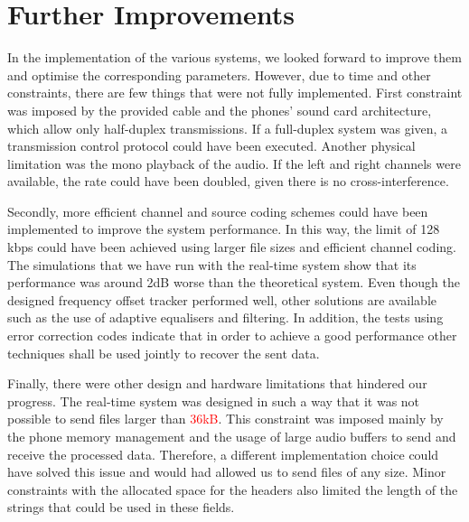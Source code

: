 \documentclass[12pt,a4paper,openright]{report}
\begin{document}
\section{Further Improvements}
In the implementation of the various systems, we looked forward to improve them and optimise the corresponding parameters. However, due to time and other constraints, there are few things that were not fully implemented. 
First constraint was imposed by the provided cable and the phones' sound card architecture, which allow only half-duplex transmissions. If a full-duplex system was given, a transmission control protocol could have been executed. Another physical limitation was the mono playback of the audio. If the left and right channels were available, the rate could have been doubled, given there is no cross-interference. 

Secondly, more efficient channel and source coding schemes could have been implemented to improve the system performance. In this way, the limit of 128 kbps could have been achieved using larger file sizes and efficient channel coding. The simulations that we have run with the real-time system show that its performance was around 2dB worse than the theoretical system.  Even though the designed frequency offset tracker performed well, other solutions are available such as the use of adaptive equalisers and filtering. In addition, the tests using error correction codes indicate that in order to achieve a good performance other techniques shall be used jointly to recover the sent data.  

Finally, there were other design and hardware limitations that hindered our progress. The real-time system was designed in such a way that it was not possible to send files larger than \textcolor{red}{36kB}. This constraint was imposed mainly by the phone memory management and the usage of large audio buffers to send and receive the processed data. Therefore, a different implementation choice could have solved this issue and would had allowed us to send files of any size. Minor constraints with the allocated space for the headers also limited the length of the strings that could be used in these fields.  
\end{document}
